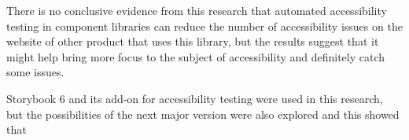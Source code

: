 \documentclass{master_thesis}
\begin{document}
There is no conclusive evidence from this research that automated accessibility testing in component libraries can reduce the number of accessibility issues on the website of other product that uses this library, but the results suggest that it might help bring more focus to the subject of accessibility and definitely catch some issues.

Storybook 6 and its add-on for accessibility testing were used in this research, but the possibilities of the next major version were also explored and this showed that
\end{document}
